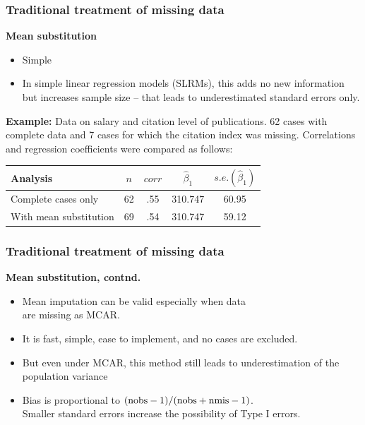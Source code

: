 \documentclass{beamer}
\begin{document}
\begin{frame}
\frametitle{Traditional treatment of missing data}
\textbf{Mean substitution}
\vspace{0.2cm}
  \begin{itemize}
  \item[\ding{51}] Simple
  \item[\ding{55}] In simple linear regression models (SLRMs), this adds no new information but increases sample size – that leads to underestimated standard errors only.
  \end{itemize} 
  \vspace{0.2cm}
\textbf{Example:} Data on salary and citation level of publications. 62 cases with complete data and 7 cases for which the citation index was missing. Correlations and regression coefficients were compared as follows:

\begin{table}
\begin{tabular}{l c c c c}
\toprule
Analysis & $n$ & $corr$ & $\widehat{\beta}_1$ & $\textit{s.e.}(\widehat{\beta}_1)$\\
\midrule
Complete cases only & 62 & .55 &  310.747 & 60.95 \\
With mean substitution & 69 & .54 &  310.747 & 59.12 \\
\bottomrule
\end{tabular}
\end{table}
\end{frame}
\begin{frame}
\frametitle{Traditional treatment of missing data}
\textbf{Mean substitution, contnd.} \\
\medskip
\begin{itemize}
    \item Mean imputation can be valid especially when data \\are missing as MCAR.
    \smallskip
    \item It is fast, simple, ease to implement, and no cases are excluded.
    \smallskip
    \item But even under MCAR, this method still leads to underestimation of the population variance 
    \smallskip
    \item Bias is proportional to $( \textnormal{nobs} - 1)/( \textnormal{nobs} + \textnormal{nmis} - 1)$. \\Smaller standard errors increase the possibility of Type I errors.
\end{itemize}
\end{frame}
\end{document}
